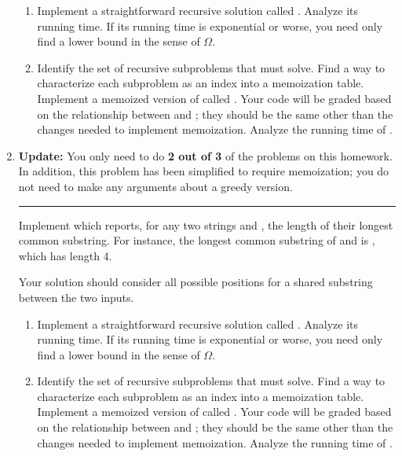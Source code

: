 \documentclass{article}
\begin{document}
\begin{enumerate}
    \begin{enumerate}

    \item Implement a straightforward recursive solution called
      .  Analyze its running time.  If its running
      time is exponential or worse, you need only find a lower bound in the
      sense of \(\Omega\).

    \item
      Identify the set of recursive subproblems that 
      must solve.  Find a way to characterize each subproblem as an index into a
      memoization table.  Implement a memoized version of
       called .  Your code will be
      graded based on the relationship between  and
      ; they should be the same other than the
      changes needed to implement memoization.  Analyze the running time of
      .

    \end{enumerate}

  \newpage
  \item

    \noindent\textbf{Update:} You only need to do \textbf{2 out of 3} of the
    problems on this homework.  In addition, this problem has been simplified to
    require memoization; you do not need to make any arguments about a greedy
    version.

    \rule{\linewidth}{1pt}

    Implement  which reports, for any two strings
     and , the length of their longest common substring.
    For instance, the longest common substring of  and
     is , which has length 4.

    Your solution should consider all possible positions for a shared substring
    between the two inputs.

    \begin{enumerate}

    \item Implement a straightforward recursive solution called
      .  Analyze its running time.  If its running
      time is exponential or worse, you need only find a lower bound in the
      sense of \(\Omega\).

    \item
      Identify the set of recursive subproblems that 
      must solve.  Find a way to characterize each subproblem as an index into a
      memoization table.  Implement a memoized version of
       called .  Your code will be graded
      based on the relationship between  and
      ; they should be the same other than the changes
      needed to implement memoization.  Analyze the running time of
      .


\end{enumerate}
\end{enumerate}
\end{document}
